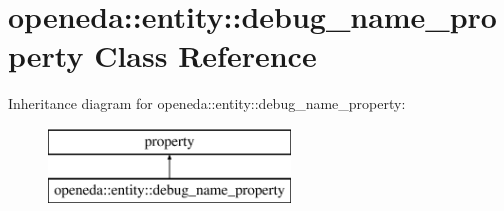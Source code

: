 \hypertarget{classopeneda_1_1entity_1_1debug__name__property}{\section{openeda\-:\-:entity\-:\-:debug\-\_\-name\-\_\-property Class Reference}
\label{classopeneda_1_1entity_1_1debug__name__property}
}
Inheritance diagram for openeda\-:\-:entity\-:\-:debug\-\_\-name\-\_\-property\-:\begin{figure}[H]
\begin{center}
\leavevmode
\includegraphics[height=2.000000cm]{classopeneda_1_1entity_1_1debug__name__property}
\end{center}
\end{figure}
